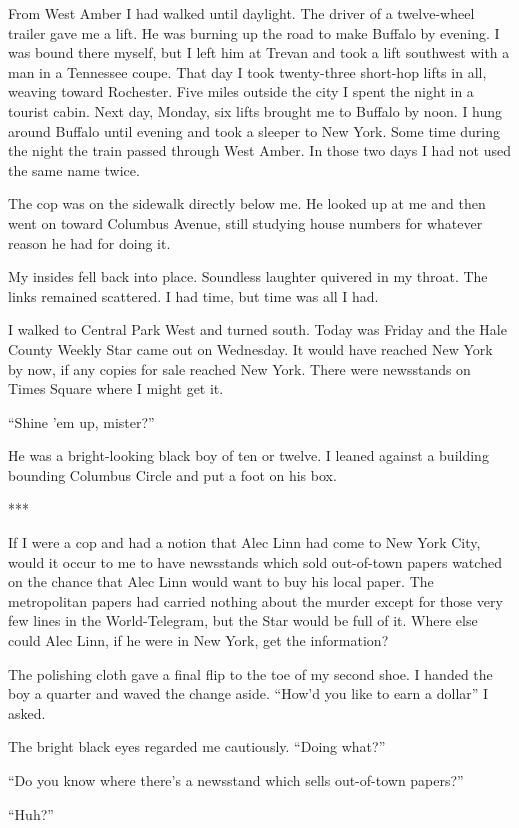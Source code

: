 \documentclass{novel}
\begin{document}
{From West Amber I had walked until daylight. The driver of a twelve-wheel trailer gave me a lift. He was burning up the road to make Buffalo by evening. I was bound there myself, but I left him at Trevan and took a lift southwest with a man in a Tennessee coupe. That day I took twenty-three short-hop lifts in all, weaving toward Rochester. Five miles outside the city I spent the night in a tourist cabin. Next day, Monday, six lifts brought me to Buffalo by noon. I hung around Buffalo until evening and took a sleeper to New York. Some time during the night the train passed through West Amber. In those two days I had not used the same name twice.

The cop was on the sidewalk directly below me. He looked up at me and then went on toward Columbus Avenue, still studying house numbers for whatever reason he had for doing it.

My insides fell back into place. Soundless laughter quivered in my throat. The links remained scattered. I had time, but time was all I had.

I walked to Central Park West and turned south. Today was Friday and the Hale County Weekly Star came out on Wednesday. It would have reached New York by now, if any copies for sale reached New York. There were newsstands on Times Square where I might get it.

“Shine ’em up, mister?”

He was a bright-looking black boy of ten or twelve. I leaned against a building bounding Columbus Circle and put a foot on his box.

***

If I were a cop and had a notion that Alec Linn had come to New York City, would it occur to me to have newsstands which sold out-of-town papers watched on the chance that Alec Linn would want to buy his local paper. The metropolitan papers had carried nothing about the murder except for those very few lines in the World-Telegram, but the Star would be full of it. Where else could Alec Linn, if he were in New York, get the information?

The polishing cloth gave a final flip to the toe of my second shoe. I handed the boy a quarter and waved the change aside. “How’d you like to earn a dollar” I asked.

The bright black eyes regarded me cautiously. “Doing what?”

“Do you know where there’s a newsstand which sells out-of-town papers?”

“Huh?”

}
\end{document}
